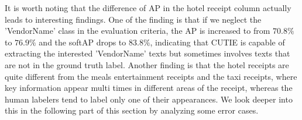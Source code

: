 \documentclass[10pt,twocolumn,letterpaper]{article}
\begin{document}
It is worth noting that the difference of AP in the hotel receipt column actually leads to interesting findings. One of the finding is that if we neglect the 'VendorName' class in the evaluation criteria, the AP is increased to from $70.8\%$ to $76.9\%$ and the softAP drops to $83.8\%$, indicating that CUTIE is capable of extracting the interested 'VendorName' texts but sometimes involves texts that are not in the ground truth label. Another finding is that the hotel receipts are quite different from the meals entertainment receipts and the taxi receipts, where key information appear multi times in different areas of the receipt, whereas the human labelers tend to label only one of their appearances. We look deeper into this in the following part of this section by analyzing some error cases.
\begin{figure}
\begin{center}
 \\ 

\end{center}
\end{figure}
\end{document}
